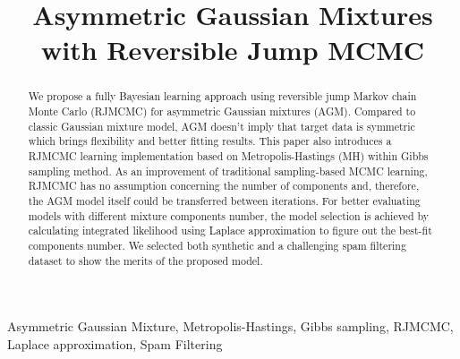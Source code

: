 \documentclass[conference]{IEEEtran}
\begin{document}
\title{Asymmetric Gaussian Mixtures with Reversible Jump MCMC\\
}

\author{
\and
{}
}

\maketitle

\begin{abstract}
We propose a fully Bayesian learning approach using reversible jump Markov  chain Monte Carlo (RJMCMC) for asymmetric Gaussian mixtures (AGM). Compared to classic Gaussian mixture model, AGM doesn't imply that target data is symmetric which brings flexibility and better fitting results. This paper also introduces a RJMCMC learning implementation based on Metropolis-Hastings (MH) within Gibbs sampling method. As an improvement of traditional sampling-based MCMC learning, RJMCMC has no assumption concerning the number of components and, therefore, the AGM model itself could be transferred between iterations. For better evaluating models with different mixture components number, the model selection is achieved by calculating integrated likelihood using Laplace approximation to figure out the best-fit components number. We selected both synthetic and a challenging spam filtering dataset to show the merits of the proposed model. 
\end{abstract}

\begin{IEEEkeywords}
Asymmetric Gaussian Mixture, Metropolis-Hastings, Gibbs sampling, RJMCMC, Laplace approximation, Spam Filtering
\end{IEEEkeywords}
\end{document}
